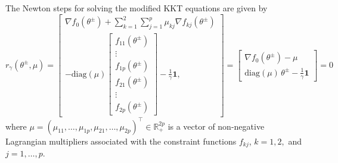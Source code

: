 \documentclass[11pt]{report}
\begin{document}
The Newton steps for solving the modified KKT equations are given by 
\[r_\gamma(\theta^{\pm}, \mu) = \begin{bmatrix}
\nabla f_0(\theta^{\pm}) + \sum_{k = 1}^2 \sum_{j = 1}^{p} \mu_{kj}  \nabla f_{kj}(\theta^{\pm})\\
-\text{diag}(\mu) \begin{bmatrix}
  f_{11}(\theta^{\pm}) \\
  \vdots \\
  f_{1p}(\theta^{\pm}) \\
  f_{21}(\theta^{\pm}) \\
  \vdots \\
  f_{2p}(\theta^{\pm})
\end{bmatrix}
- \frac{1}{\gamma}\mathbf{1},
\end{bmatrix} = \begin{bmatrix}
\nabla f_0(\theta^{\pm}) - \mu\\
\text{diag}(\mu) \, \theta^{\pm}
- \frac{1}{\gamma}\mathbf{1}
\end{bmatrix} = 0\]
where $\mu = (\mu_{11}, \ldots, \mu_{1p}, \mu_{21}, \ldots, \mu_{2p})^{\top} \in \mathbb{R}_+^{2p}$ is a vector of non-negative Lagrangian multipliers associated with the constraint functions $f_{kj}$, $k=1,2,$ and $j=1,\ldots,p$. 
\end{document}

